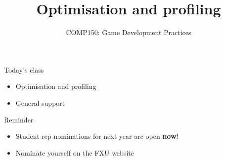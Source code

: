 \usepackage{../../beamerthemeFalmouthGamesAcademy}
\usepackage{multimedia}
\graphicspath{ {../../} }


\usepackage[normalem]{ulem}
\usepackage{wasysym}

\usepackage{pdfpages}

\usetikzlibrary{arrows,automata}


\title{Optimisation and profiling}
\subtitle{COMP150: Game Development Practices}

\frame{\titlepage} 

\begin{frame}{Today's class}
    \begin{itemize}
        \item Optimisation and profiling
        \item General support
    \end{itemize}
\end{frame}

\begin{frame}{Reminder}
    \begin{itemize}
    	\item Student rep nominations for next year are open \textbf{now}!
        \item Nominate yourself on the FXU website
    \end{itemize}
\end{frame}






